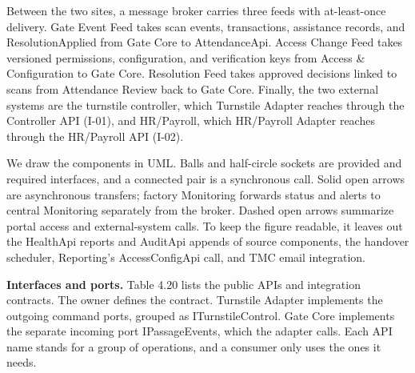 Between the two sites, a message broker carries three feeds with at-least-once delivery. Gate Event Feed takes scan events, transactions, assistance records, and ResolutionApplied from Gate Core to AttendanceApi. Access Change Feed takes versioned permissions, configuration, and verification keys from Access \& Configuration to Gate Core. Resolution Feed takes approved decisions linked to scans from Attendance Review back to Gate Core. Finally, the two external systems are the turnstile controller, which Turnstile Adapter reaches through the Controller API (I-01), and HR/Payroll, which HR/Payroll Adapter reaches through the HR/Payroll API (I-02).

We draw the components in UML. Balls and half-circle sockets are provided and required interfaces, and a connected pair is a synchronous call. Solid open arrows are asynchronous transfers; factory Monitoring forwards status and alerts to central Monitoring separately from the broker. Dashed open arrows summarize portal access and external-system calls. To keep the figure readable, it leaves out the HealthApi reports and AuditApi appends of source components, the handover scheduler, Reporting's AccessConfigApi call, and TMC email integration.

\textbf{Interfaces and ports.} Table 4.20 lists the public APIs and integration contracts. The owner defines the contract. Turnstile Adapter implements the outgoing command ports, grouped as ITurnstileControl. Gate Core implements the separate incoming port IPassageEvents, which the adapter calls. Each API name stands for a group of operations, and a consumer only uses the ones it needs.

